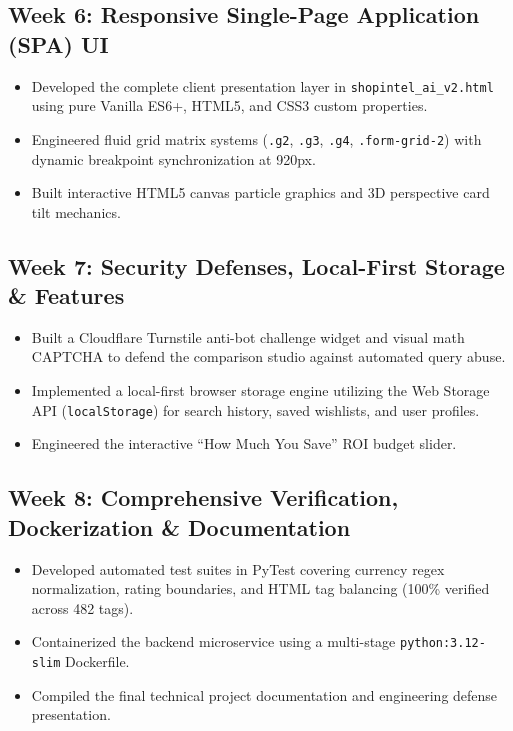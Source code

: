 \documentclass[12pt,a4paper,oneside]{report}
\begin{document}
\subsection{Week 6: Responsive Single-Page Application (SPA) UI}
\begin{itemize}
    \item Developed the complete client presentation layer in \texttt{shopintel\_ai\_v2.html} using pure Vanilla ES6+, HTML5, and CSS3 custom properties.
    \item Engineered fluid grid matrix systems (\texttt{.g2}, \texttt{.g3}, \texttt{.g4}, \texttt{.form-grid-2}) with dynamic breakpoint synchronization at 920px.
    \item Built interactive HTML5 canvas particle graphics and 3D perspective card tilt mechanics.
\end{itemize}

\subsection{Week 7: Security Defenses, Local-First Storage \& Features}
\begin{itemize}
    \item Built a Cloudflare Turnstile anti-bot challenge widget and visual math CAPTCHA to defend the comparison studio against automated query abuse.
    \item Implemented a local-first browser storage engine utilizing the Web Storage API (\texttt{localStorage}) for search history, saved wishlists, and user profiles.
    \item Engineered the interactive ``How Much You Save'' ROI budget slider.
\end{itemize}

\subsection{Week 8: Comprehensive Verification, Dockerization \& Documentation}
\begin{itemize}
    \item Developed automated test suites in PyTest covering currency regex normalization, rating boundaries, and HTML tag balancing (100\% verified across 482 tags).
    \item Containerized the backend microservice using a multi-stage \texttt{python:3.12-slim} Dockerfile.
    \item Compiled the final technical project documentation and engineering defense presentation.
\end{itemize}
\end{document}

